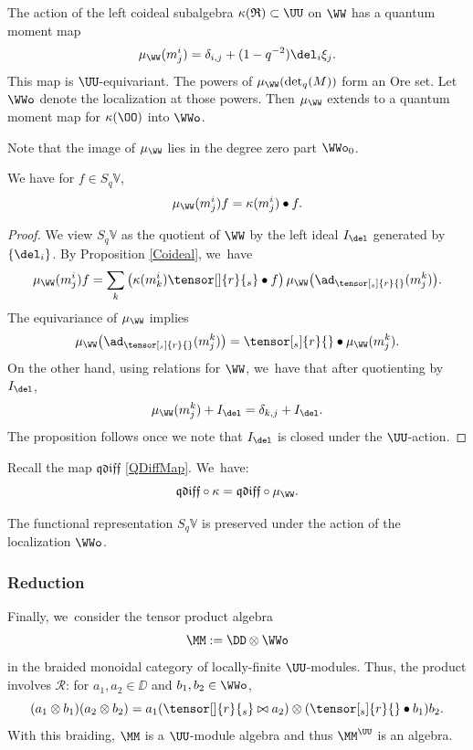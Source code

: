 \begin{prop}
The action of the left coideal subalgebra $\kappa(\mathfrak{R})\subset\UU$ on $\WW$ has a quantum moment map
\[
\mu_\WW(m^i_j)= \delta_{i,j}+(1-q^{-2})\del_i\xi_j.
\]
This map is $\UU$-equivariant.
The powers of $\mu_\WW(\det_q(M))$ form an Ore set.
Let $\WWo$ denote the localization at those powers.
Then $\mu_\WW$ extends to a quantum moment map for $\kappa(\OO)$ into $\WWo$.
\end{prop}

Note that the image of $\mu_\WW$ lies in the degree zero part $\WWo_0$.

\begin{prop}\label{WBasic}
We have for $f\in S_q\mathbb{V}$,
\[
\mu_\WW(m^i_j) f=\kappa(m^i_j)\bullet f.
\]
\end{prop}

\begin{proof}
We view $S_q\mathbb{V}$ as the quotient of $\WW$ by the left ideal $I_\del$ generated by $\{ \del_i\}$.
By Proposition \ref{Coideal}, we~have
\[
\mu_\WW(m^i_j)f=\sum_{k}\left(\kappa(m^i_k)\tensor[]{r}{_s} \bullet f\right)\mu_\WW\big(\ad_{\tensor[_s]{r}{}}(m^k_{j})\big).
\]
The equivariance of $\mu_\WW$ implies
\[
\mu_\WW\big(\ad_{\tensor[_s]{r}{}}(m^k_{j})\big)=\tensor[_s]{r}{}\bullet\mu_\WW(m^k_j).
\]
On the other hand, using relations for $\WW$, we~have that after quotienting by $I_\del$,
\[
\mu_\WW(m^k_j) +I_\del=\delta_{k,j}+I_\del.
\]
The proposition follows once we note that $I_\del$ is closed under the $\UU$-action.
\end{proof}

\begin{cor}\label{QDiffMoment}
Recall the map $\mathfrak{qdiff}$ \eqref{QDiffMap}. We~have:
\[
\mathfrak{qdiff}\circ\kappa = \mathfrak{qdiff}\circ\mu_\WW.
\]
\end{cor}

\begin{cor}
The functional representation $S_q\mathbb{V}$ is preserved under the action of the localization $\WWo$.
\end{cor}

\subsubsection{Reduction}\label{Reduct}
Finally, we~consider the tensor product algebra
\[
\MM:=\DD\otimes\WWo
\]
in the braided monoidal category of locally-finite $\UU$-modules.
Thus, the product involves $\mathcal{R}$: for $a_1,a_2\in\DD$ and $b_1,b_2\in\WWo$,
\[
(a_1\otimes b_1)(a_2\otimes b_2)=a_1(\tensor[]{r}{_s}\bowtie a_2)\otimes (\tensor[_s]{r}{}\bullet b_1)b_2.
\]
With this braiding, $\MM$ is a $\UU$-module algebra and thus $\MM^\UU$ is an algebra.

